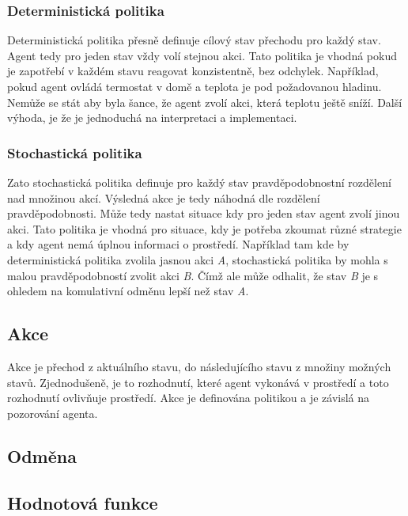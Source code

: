   \subsubsection{Deterministická politika}
  
  Deterministická politika přesně definuje cílový stav přechodu pro každý stav.
  Agent tedy pro jeden stav vždy volí stejnou akci.
  Tato politika je vhodná pokud je zapotřebí v každém stavu reagovat konzistentně, bez odchylek.
  Například, pokud agent ovládá termostat v domě a teplota je pod požadovanou hladinu.
  Nemůže se stát aby byla šance, že agent zvolí akci, která teplotu ještě sníží.
  Další výhoda, je že je jednoduchá na interpretaci a implementaci.\cite{Policies}

  \subsubsection{Stochastická politika}
  
  Zato stochastická politika definuje pro každý stav pravděpodobnostní rozdělení nad množinou akcí.
  Výsledná akce je tedy náhodná dle rozdělení pravděpodobnosti.
  Může tedy nastat situace kdy pro jeden stav agent zvolí jinou akci.
  Tato politika je vhodná pro situace, kdy je potřeba zkoumat různé strategie a kdy agent nemá úplnou informaci o prostředí.
  Například tam kde by deterministická politika zvolila jasnou akci \textit{A}, stochastická politika by mohla  s malou pravděpodobností zvolit akci \textit{B}.
  Čímž ale může odhalit, že stav \textit{B} je s ohledem na komulativní odměnu lepší než stav \textit{A}.\cite{Policies}


  \subsection{Akce}

  Akce je přechod z aktuálního stavu, do následujícího stavu z množiny možných stavů.
  Zjednodušeně, je to rozhodnutí, které agent vykonává v prostředí a toto rozhodnutí ovlivňuje prostředí.
  Akce je definována politikou a je závislá na pozorování agenta.
  
  
  
  
  \subsection{Odměna}

\subsection{Hodnotová funkce}
